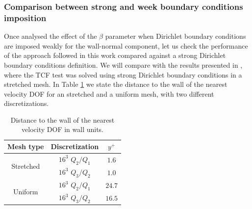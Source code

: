\subsubsection{Comparison between strong and week boundary conditions imposition}
Once analysed the effect of the $ \beta $ parameter when Dirichlet boundary conditions are imposed weakly for the wall-normal component, let us check the performance of the approach followed in this work compared against a strong Dirichlet boundary conditions definition. We will compare with the results presented in \cite{colomes_mixed_2015}, where the TCF test was solved using strong Dirichlet boundary conditions in a stretched mesh. In Table \ref{tab-y_plus} we state the distance to the wall of the nearest velocity DOF for an stretched and a uniform mesh, with two different discretizations.
\begin{table}[h]
\caption{Distance to the wall of the nearest velocity DOF in wall units.}
\label{tab-y_plus}
\centering
\begin{tabular}{ccc}
\toprule
Mesh type&Discretization&$ y^+ $\\
\midrule
\midrule
\multirow{2}{*}{Stretched}&$ 16^3 $ $ Q_2/Q_1 $&$ 1.6 $\\
&$ 16^3 $ $ Q_3/Q_2 $&$ 1.0 $\\
\midrule
\multirow{2}{*}{Uniform}&$ 16^3 $ $ Q_2/Q_1 $&$ 24.7 $\\
&$ 16^3 $ $ Q_3/Q_2 $&$ 16.5 $\\
\bottomrule
\end{tabular}
\end{table}

